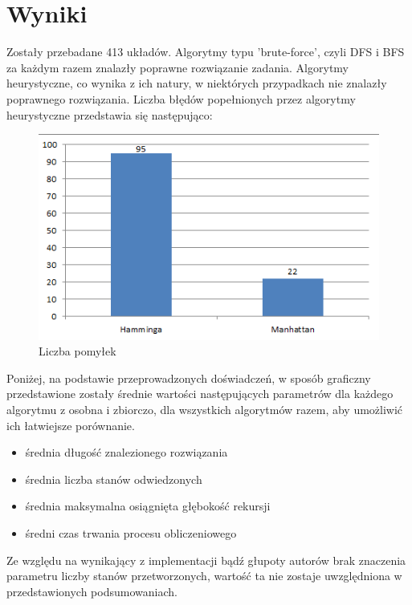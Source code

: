 \documentclass{classrep}
\begin{document}
    \section{Wyniki} {
        Zostały przebadane 413 układów.
        Algorytmy typu 'brute-force', czyli DFS i BFS za każdym razem znalazły poprawne rozwiązanie
        zadania. Algorytmy heurystyczne, co wynika z ich natury, w niektórych przypadkach nie
        znalazły poprawnego rozwiązania. Liczba błędów popełnionych przez algorytmy heurystyczne
        przedstawia się następująco:
        \begin{figure}[!htbp]
            \centering
            \includegraphics[width=\textwidth, width=90mm]{img/NumberOfErrors.png}
            \caption{Liczba pomyłek}
            \label{NumberOfErrors}
        \end{figure}


        Poniżej, na podstawie przeprowadzonych doświadczeń, w sposób graficzny przedstawione
        zostały średnie wartości następujących parametrów dla każdego algorytmu z osobna i zbiorczo,
        dla wszystkich algorytmów razem, aby umożliwić ich łatwiejsze porównanie.
        \begin{itemize}
            \item średnia długość znalezionego rozwiązania
            \item średnia liczba stanów odwiedzonych
            \item średnia maksymalna osiągnięta głębokość rekursji
            \item średni czas trwania procesu obliczeniowego
        \end{itemize}
        Ze względu na wynikający z implementacji bądź głupoty autorów brak znaczenia parametru
        liczby stanów przetworzonych, wartość ta nie zostaje uwzględniona w przedstawionych podsumowaniach.


}
\end{document}
